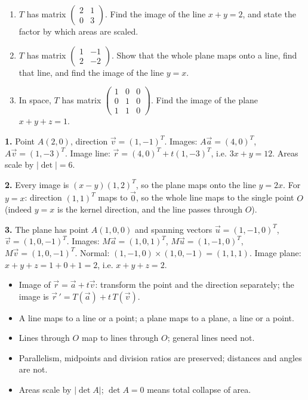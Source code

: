 \documentclass[11pt]{article}
\begin{document}
\begin{exercice}
\begin{enumerate}
\item $T$ has matrix $\begin{pmatrix} 2 & 1 \\ 0 & 3 \end{pmatrix}$. Find the image of the line $x + y = 2$, and state the factor by which areas are scaled.
\item $T$ has matrix $\begin{pmatrix} 1 & -1 \\ 2 & -2 \end{pmatrix}$. Show that the whole plane maps onto a line, find that line, and find the image of the line $y = x$.
\item In space, $T$ has matrix $\begin{pmatrix} 1 & 0 & 0 \\ 0 & 1 & 0 \\ 1 & 1 & 0 \end{pmatrix}$. Find the image of the plane $x + y + z = 1$.
\end{enumerate}
\end{exercice}

\begin{corrige}
\textbf{1.} Point $A(2,0)$, direction $\vec{v} = (1,-1)^T$. Images: $A\vec{a} = (4,0)^T$, $A\vec{v} = (1,-3)^T$. Image line: $\vec{r} = (4,0)^T + t(1,-3)^T$, i.e. $3x + y = 12$. Areas scale by $|\det| = 6$.

\textbf{2.} Every image is $(x-y)(1,2)^T$, so the plane maps onto the line $y = 2x$. For $y = x$: direction $(1,1)^T$ maps to $\vec{0}$, so the whole line maps to the single point $O$ (indeed $y = x$ is the kernel direction, and the line passes through $O$).

\textbf{3.} The plane has point $A(1,0,0)$ and spanning vectors $\vec{u} = (1,-1,0)^T$, $\vec{v} = (1,0,-1)^T$. Images: $M\vec{a} = (1,0,1)^T$, $M\vec{u} = (1,-1,0)^T$, $M\vec{v} = (1,0,-1)^T$. Normal: $(1,-1,0) \times (1,0,-1) = (1,1,1)$. Image plane: $x + y + z = 1 + 0 + 1 = 2$, i.e. $x + y + z = 2$.
\end{corrige}

\begin{aretenir}
\begin{itemize}
\item Image of $\vec{r} = \vec{a} + t\vec{v}$: transform the point and the direction separately; the image is $\vec{r}\,' = T(\vec{a}) + t\,T(\vec{v})$.
\item A line maps to a line or a point; a plane maps to a plane, a line or a point.
\item Lines through $O$ map to lines through $O$; general lines need not.
\item Parallelism, midpoints and division ratios are preserved; distances and angles are not.
\item Areas scale by $|\det A|$; $\det A = 0$ means total collapse of area.
\end{itemize}
\end{aretenir}
\end{document}
